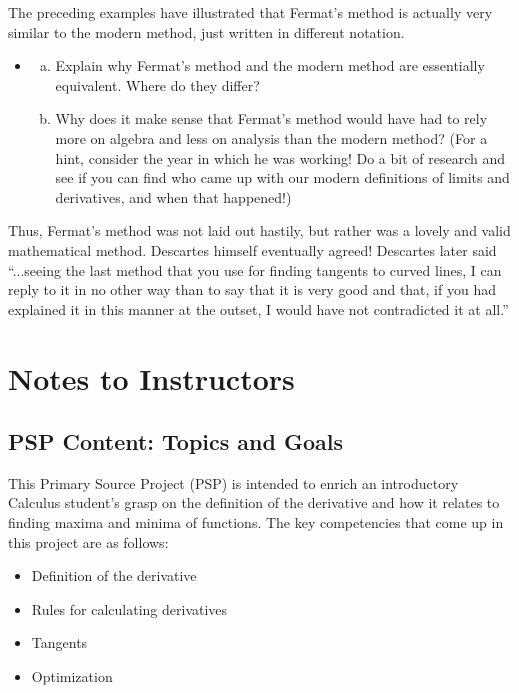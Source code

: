 \documentclass[11pt]{article}
\newcounter{tasknumb}
\newcommand{\tasknumb}[1]{\refstepcounter{tasknumb}\textmd{\textbf{$\fbox{$\fbox{Task \thetasknumb}$}$}}#1}
\newenvironment{task}[1][]%
 {\begin{itemize}
 \item[\tasknumb{#1}]  }
{
    \end{itemize}    }%
\begin{document}
The preceding examples have illustrated that Fermat's method is actually very similar to the modern method, just written in different notation.  

\begin{task}\begin{enumerate}[(a)]
    \item  Explain why Fermat's method and the modern method are essentially equivalent.  Where do they differ?
\item Why does it make sense that Fermat's method would have had to rely more on algebra and less on analysis than the modern method? (For a hint, consider the year in which he was working! Do a bit of research and see if you can find who came up with our modern definitions of limits and derivatives, and when that happened!)
\end{enumerate}
\end{task}

Thus, Fermat's method was not laid out hastily, but rather was a lovely and valid mathematical method.  Descartes himself eventually agreed!  Descartes later said ``{\sf ...seeing the last method that you use for finding tangents to curved lines, I can reply to it in no other way than to say that it is very good and that, if you had explained it in this manner at the outset, I would have not contradicted it at all.}'' \citep[page 192]{FermatBio}


 
      {}                              
      \pagebreak 
      
      
\section*{Notes to Instructors}

\subsection*{PSP Content: Topics and Goals}

This Primary Source Project (PSP) is intended to enrich an introductory Calculus student's grasp on the definition of the derivative and how it relates to finding maxima and minima of functions.  The key competencies that come up in this project are as follows:
\begin{itemize}
    \item Definition of the derivative
    \item Rules for calculating derivatives
    \item Tangents
    \item Optimization
\end{itemize}
\end{document}
